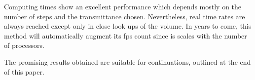 \documentclass[oneside,a4paper,english,links]{amca}
\begin{document}
Computing times show an excellent performance which depends mostly on the number of steps and the transmittance chosen. Nevertheless, real time rates are always reached except only in close look ups of the volume. In years to come, this method will automatically augment its fps count since is scales with the number of processors.

The promising results obtained are suitable for continuations, outlined at the end of this paper.













\end{document}
